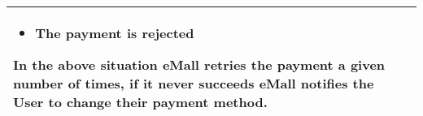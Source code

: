 \documentclass[11pt]{article}
\begin{document}
\begin{description}
\begin{table}[H]
\begin{tabularx}{\textwidth}{|>{\hsize=0.5\hsize}X|>{\hsize=1.5\hsize}X|}
\begin{minipage}[t]{\hsize}
                \vspace{0pt}
                \begin{itemize}[topsep=0pt, leftmargin=*]
                    \item The payment is rejected
                \end{itemize}
                \vspace{8pt}
                \end{minipage}
                In the above situation eMall retries the payment a given number of times, if it never succeeds eMall notifies the User to change their payment method.
                \vspace{6pt}
            \\
            \hline
        \end{tabularx}
    \end{table}
    

\end{description}
\end{document}
